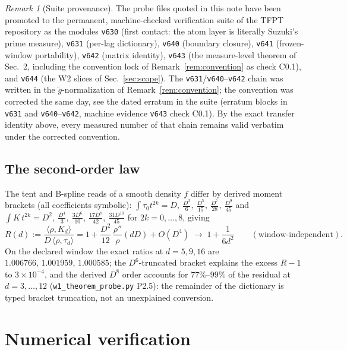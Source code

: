 \documentclass[11pt,a4paper]{article}
\theoremstyle{remark}
\newtheorem{remark}[theorem]{Remark}
\begin{document}
\begin{remark}[Suite provenance]\label{rem:suite}
The probe files quoted in this note have been promoted to the
permanent, machine-checked verification suite of the TFPT repository
\cite{TFPT} as the modules \texttt{v630} (first contact: the atom
layer is literally Suzuki's prime measure), \texttt{v631} (per-lag
dictionary), \texttt{v640} (boundary closure), \texttt{v641}
(frozen-window portability), \texttt{v642} (matrix identity),
\texttt{v643} (the measure-level theorem of Sec.~2, including the
convention lock of Remark~\ref{rem:convention} as check C0.1), and
\texttt{v644} (the W2 slices of Sec.~\ref{sec:scope}).  The
\texttt{v631}/\texttt{v640}--\texttt{v642} chain was written in the
$\tilde g$-normalization of Remark~\ref{rem:convention}; the
convention was corrected the same day, see the dated erratum in the
suite (erratum blocks in \texttt{v631} and
\texttt{v640}--\texttt{v642}, machine evidence \texttt{v643} check
C0.1).  By the exact transfer identity above, every measured number of
that chain remains valid verbatim under the corrected convention.
\end{remark}

\subsection{The second-order law}
The tent and B-spline reads of a smooth density $f$ differ by derived
moment brackets (all coefficients symbolic):
$\int\tau_0t^{2k}=D,\ \tfrac{D^3}6,\ \tfrac{D^5}{15},\ \tfrac{D^7}{28},
\ \tfrac{D^9}{45}$ and
$\int K\,t^{2k}=D^2,\ \tfrac{D^4}3,\ \tfrac{3D^6}{10},\
\tfrac{17D^8}{42},\ \tfrac{31D^{10}}{45}$ for $2k=0,\dots,8$, giving
\begin{equation}\label{eq:momentlaw}
R(d):=\frac{\langle\rho,K_d\rangle}{D\,\langle\rho,\tau_d\rangle}
=1+\frac{D^2}{12}\,\frac{\rho''}{\rho}(dD)+O(D^4)
\;\longrightarrow\;1+\frac1{6d^2}\qquad(\text{window-independent}).
\end{equation}
On the declared window the exact ratios at $d=5,9,16$ are
$1.006766,\,1.001959,\,1.000585$; the $D^6$-truncated bracket explains
the excess $R-1$ to $3\times10^{-4}$, and the derived $D^8$ order
accounts for $77\%$--$99\%$ of the residual at $d=3,\dots,12$
(\texttt{w1\_theorem\_probe.py} P2.5): the remainder of the dictionary
is typed bracket truncation, not an unexplained conversion.

\section{Numerical verification}\label{sec:port}
\end{document}
